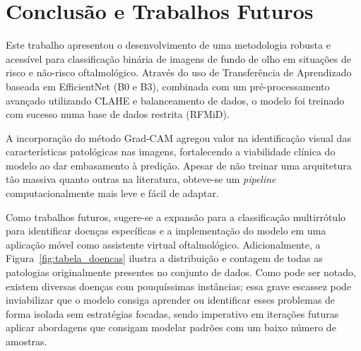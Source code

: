 \documentclass[12pt]{article}
\begin{document}


\section{Conclusão e Trabalhos Futuros}

Este trabalho apresentou o desenvolvimento de uma metodologia robusta e acessível para classificação binária de imagens de fundo de olho em situações de risco e não-risco oftalmológico. Através do uso de Transferência de Aprendizado baseada em EfficientNet (B0 e B3), combinada com um pré-processamento avançado utilizando CLAHE e balanceamento de dados, o modelo foi treinado com sucesso numa base de dados restrita (RFMiD).

A incorporação do método Grad-CAM agregou valor na identificação visual das características patológicas nas imagens, fortalecendo a viabilidade clínica do modelo ao dar embasamento à predição. Apesar de não treinar uma arquitetura tão massiva quanto outras na literatura, obteve-se um \textit{pipeline} computacionalmente mais leve e fácil de adaptar. 

Como trabalhos futuros, sugere-se a expansão para a classificação multirrótulo para identificar doenças específicas e a implementação do modelo em uma aplicação móvel como assistente virtual oftalmológico. Adicionalmente, a Figura~\ref{fig:tabela_doencas} ilustra a distribuição e contagem de todas as patologias originalmente presentes no conjunto de dados. Como pode ser notado, existem diversas doenças com pouquíssimas instâncias; essa grave escassez pode inviabilizar que o modelo consiga aprender ou identificar esses problemas de forma isolada sem estratégias focadas, sendo imperativo em iterações futuras aplicar abordagens que consigam modelar padrões com um baixo número de amostras.
\end{document}
